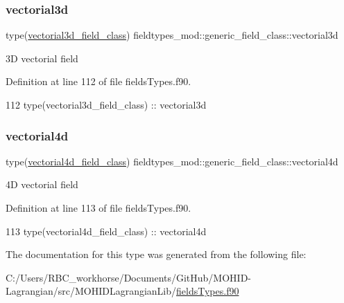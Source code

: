 \subsubsection{\texorpdfstring{vectorial3d}{vectorial3d}}
{\footnotesize\ttfamily type(\mbox{\hyperlink{structfieldtypes__mod_1_1vectorial3d__field__class}{vectorial3d\+\_\+field\+\_\+class}}) fieldtypes\+\_\+mod\+::generic\+\_\+field\+\_\+class\+::vectorial3d\hspace{0.3cm}{\ttfamily [private]}}



3D vectorial field 



Definition at line 112 of file fields\+Types.\+f90.


\begin{DoxyCode}
112         \textcolor{keywordtype}{type}(vectorial3d\_field\_class) :: vectorial3d
\end{DoxyCode}
\mbox{\label{structfieldtypes__mod_1_1generic__field__class_a9a4f0f601cf52de94dcbbaa0a48bcf95}} 
\subsubsection{\texorpdfstring{vectorial4d}{vectorial4d}}
{\footnotesize\ttfamily type(\mbox{\hyperlink{structfieldtypes__mod_1_1vectorial4d__field__class}{vectorial4d\+\_\+field\+\_\+class}}) fieldtypes\+\_\+mod\+::generic\+\_\+field\+\_\+class\+::vectorial4d\hspace{0.3cm}{\ttfamily [private]}}



4D vectorial field 



Definition at line 113 of file fields\+Types.\+f90.


\begin{DoxyCode}
113         \textcolor{keywordtype}{type}(vectorial4d\_field\_class) :: vectorial4d
\end{DoxyCode}


The documentation for this type was generated from the following file\+:\begin{DoxyCompactItemize}
\item 
C\+:/\+Users/\+R\+B\+C\+\_\+workhorse/\+Documents/\+Git\+Hub/\+M\+O\+H\+I\+D-\/\+Lagrangian/src/\+M\+O\+H\+I\+D\+Lagrangian\+Lib/\mbox{\hyperlink{fields_types_8f90}{fields\+Types.\+f90}}\end{DoxyCompactItemize}
